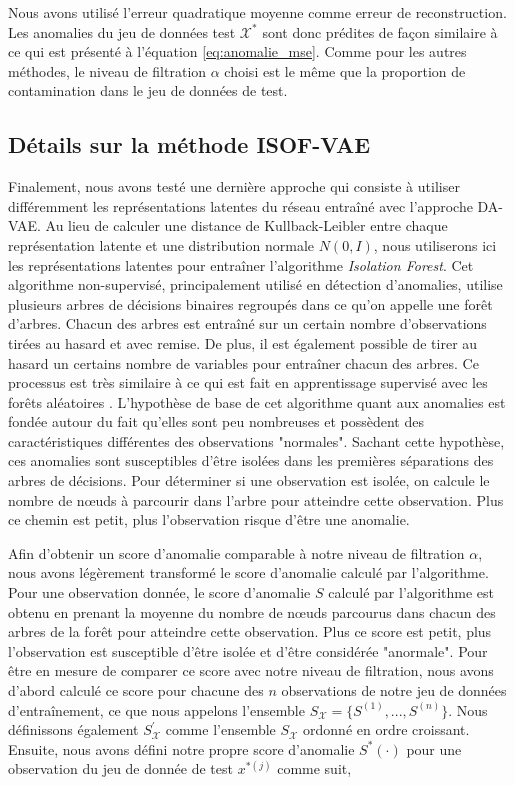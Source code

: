 Nous avons utilisé l'erreur quadratique moyenne comme erreur de reconstruction. Les anomalies du jeu de données test $\mathcal{X^*}$ sont donc prédites de façon similaire à ce qui est présenté à l'équation \ref{eq:anomalie_mse}. Comme pour les autres méthodes, le niveau de filtration $\alpha$ choisi est le même que la proportion de contamination dans le jeu de données de test. 

\subsection{Détails sur la méthode ISOF-VAE} \label{isof_vae}

Finalement, nous avons testé une dernière approche qui consiste à utiliser différemment les représentations latentes du réseau entraîné avec l'approche DA-VAE. Au lieu de calculer une distance de Kullback-Leibler entre chaque représentation latente et une distribution normale $N(0,I)$, nous utiliserons ici les représentations latentes pour entraîner l'algorithme \textit{Isolation Forest}. Cet algorithme non-supervisé, principalement utilisé en détection d'anomalies, utilise plusieurs arbres de décisions binaires regroupés dans ce qu'on appelle une forêt d'arbres. Chacun des arbres est entraîné sur un certain nombre d'observations tirées au hasard et avec remise. De plus, il est également possible de tirer au hasard un certains nombre de variables pour entraîner chacun des arbres. Ce processus est très similaire à ce qui est fait en apprentissage supervisé avec les forêts aléatoires \citep{Statistics01randomforests}. L'hypothèse de base de cet algorithme quant aux anomalies est fondée autour du fait qu'elles sont peu nombreuses et possèdent des caractéristiques différentes des observations "normales". Sachant cette hypothèse, ces anomalies sont susceptibles d'être isolées dans les premières séparations des arbres de décisions. Pour déterminer si une observation est isolée, on calcule le nombre de nœuds à parcourir dans l'arbre pour atteindre cette observation. Plus ce chemin est petit, plus l'observation risque d'être une anomalie.

Afin d'obtenir un score d'anomalie comparable à notre niveau de filtration $\alpha$, nous avons légèrement transformé le score d'anomalie calculé par l'algorithme. Pour une observation donnée, le score d'anomalie $S$  calculé par l'algorithme est obtenu en prenant la moyenne du nombre de nœuds parcourus dans chacun des arbres de la forêt pour atteindre cette observation. Plus ce score est petit, plus l'observation est susceptible d'être isolée et d'être considérée "anormale". Pour être en mesure de comparer ce score avec notre niveau de filtration, nous avons d'abord calculé ce score pour chacune des $n$ observations de notre jeu de données d'entraînement, ce que nous appelons l'ensemble $S_{\mathcal{X}} = \{S^{(1)}, ..., S^{(n)}\}$. Nous définissons également $S^{'}_{\mathcal{X}}$ comme l'ensemble $S_{\mathcal{X}}$ ordonné en ordre croissant.  Ensuite, nous avons défini notre propre score d'anomalie $S^*(\cdot)$ pour une observation du jeu de donnée de test $x^{*(j)}$ comme suit,

